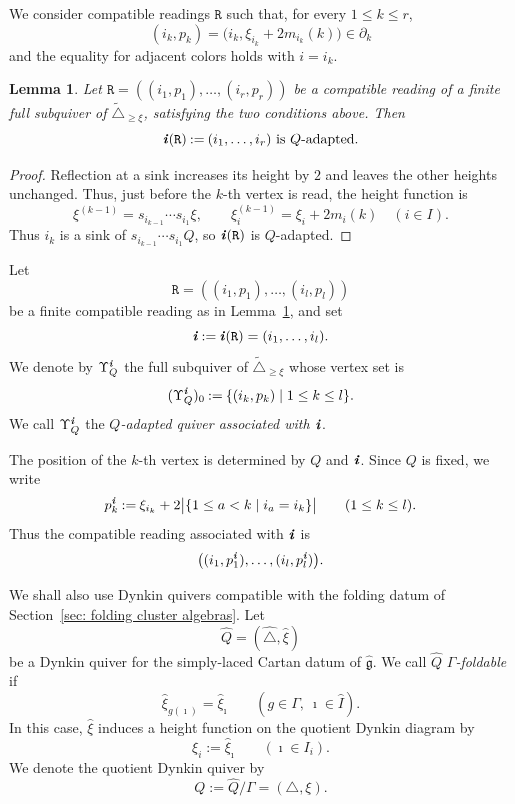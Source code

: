 \documentclass[12pt, leqno]{amsart}
\numberwithin{equation}{section}
\theoremstyle{plain}
\newtheorem{lemma}{Lemma}[section]
\theoremstyle{definition}
\newcommand{\seteq}{\mathbin{:=}}
\newcommand{\g}{\mathfrak{g}}
\newcommand{\Dynkin}{\triangle}
\newcommand{\im}{\imath}
\newcommand{\ii}{ \textbf{\textit{i}}}
\newcommand{\hI}{\widehat{I}}
\newcommand{\hQ}{\widehat{Q}}
\newcommand{\hg}{{\widehat{\g}}}
\newcommand{\ttR}{\mathtt{R}}
\newcommand{\hDynkin}{{\widehat{\Dynkin}}}
\newcommand{\tDynkin}{{\widetilde{\Dynkin}}}
\begin{document}
We consider compatible readings \(\ttR\) such that, for every \(1\leq k\leq r\), 
\[
(i_k,p_k) = \bigl(i_k,\xi_{i_k}+2m_{i_k}(k)\bigr) \in\partial_k
\]
and the equality for adjacent colors holds with \(i=i_k\). 

\begin{lemma}\label{lem: boundary readings are Q-adapted}
Let $\ttR=((i_1,p_1),\ldots,(i_r,p_r))$ be a compatible reading of a finite
full subquiver of \(\tDynkin_{\geq\xi}\), satisfying the two conditions above.
Then 
\[
\ii(\ttR)\seteq(i_1,\ldots,i_r) \text{ is \(Q\)-adapted.}
\]
\end{lemma}

\begin{proof}
Reflection at a sink increases its height by \(2\) and leaves the
other heights unchanged.  Thus, just before the \(k\)-th vertex is
read, the height function is
\[
\xi^{(k-1)}=s_{i_{k-1}}\cdots s_{i_1}\xi,
\qquad
\xi_i^{(k-1)}=\xi_i+2m_i(k)\quad(i\in I).
\]
Thus \(i_k\) is a sink of \(s_{i_{k-1}}\cdots s_{i_1}Q\), so
\(\ii(\ttR)\) is \(Q\)-adapted. 
\end{proof}

Let
\[
\ttR=((i_1,p_1),\ldots,(i_l,p_l))
\]
be a finite compatible reading as in
Lemma~\ref{lem: boundary readings are Q-adapted}, and set 
\[
\ii\seteq\ii(\ttR)=(i_1,\ldots,i_l).
\]
We denote by $\Upsilon_Q^\ii$
the full subquiver of \(\tDynkin_{\geq\xi}\) whose vertex set is
\[
(\Upsilon_Q^\ii)_0 \seteq \{(i_k,p_k)\mid1\leq k\leq l\}.
\]
We call \(\Upsilon_Q^\ii\) the
\emph{\(Q\)-adapted quiver associated with \(\ii\)}.

The position of the \(k\)-th vertex is determined by \(Q\) and
\(\ii\).  Since \(Q\) is fixed, we write
\[
p_k^\ii \seteq \xi_{i_k} + 2\bigl| \{1\leq a<k\mid i_a=i_k\} \bigr| \qquad(1\leq k\leq l). 
\]
Thus the compatible reading associated with \(\ii\) is
\[
\bigl( (i_1,p_1^\ii),\ldots,(i_l,p_l^\ii) \bigr).
\]


We shall also use Dynkin quivers compatible with the folding datum
of Section~\ref{sec: folding cluster algebras}.  Let
\[
\hQ=(\hDynkin,\widehat\xi)
\]
be a Dynkin quiver for the simply-laced Cartan datum of \(\hg\).
We call \(\hQ\) \emph{\(\Gamma\)-foldable} if 
\[
\widehat\xi_{g(\im)} = \widehat\xi_\im
\qquad (g\in \Gamma,\ \im\in\hI).
\]
In this case, \(\widehat\xi\) induces a height function on the
quotient Dynkin diagram by
\[
\xi_i \seteq \widehat\xi_\im \qquad (\im\in I_i).
\]
We denote the quotient Dynkin quiver by
\[
Q\seteq\hQ/\Gamma=(\Dynkin,\xi).
\]
\end{document}
